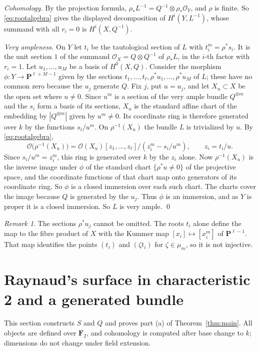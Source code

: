 \documentclass[11pt,a4paper]{article}
\theoremstyle{plain}
\theoremstyle{remark}
\newtheorem{remark}[theorem]{Remark}
\newcommand{\OO}{\mathcal O}
\newcommand{\F}{\mathbf F}
\newcommand{\PP}{\mathbf P}
\begin{document}
\emph{Cohomology.} By the projection formula, $\rho_*L^{-1}=Q^{-1}\otimes\rho_*\OO_Y$, and $\rho$ is finite. So
\eqref{eq:rootalgebra} gives the displayed decomposition of $H^i(Y,L^{-1})$, whose summand with all $r_i=0$ is
$H^i(X,Q^{-1})$.

\emph{Very ampleness.} On $Y$ let $t_i$ be the tautological section of $L$ with $t_i^m=\rho^*s_i$. It is the unit
section $1$ of the summand $\OO_X=Q\otimes Q^{-1}$ of $\rho_*L$, in the $i$-th factor with $r_i=1$. Let
$u_1,\dots,u_M$ be a basis of $H^0(X,Q)$. Consider the morphism $\phi:Y\to\PP^{\ell+M-1}$ given by the sections
$t_1,\dots,t_\ell,\rho^*u_1,\dots,\rho^*u_M$ of $L$; these have no common zero because the $u_j$ generate $Q$. Fix $j$,
put $u=u_j$, and let $X_u\subset X$ be the open set where $u\ne0$. Since $u^m$ is a section of the very ample bundle
$Q^{\otimes m}$ and the $s_i$ form a basis of its sections, $X_u$ is the standard affine chart of the embedding by
$|Q^{\otimes m}|$ given by $u^m\ne0$. Its coordinate ring is therefore generated over $k$ by the functions $s_i/u^m$. On
$\rho^{-1}(X_u)$ the bundle $L$ is trivialized by $u$. By \eqref{eq:rootalgebra},
\[
 \OO\bigl(\rho^{-1}(X_u)\bigr)=\OO(X_u)[z_1,\dots,z_\ell]/(z_i^m-s_i/u^m),\qquad z_i=t_i/u .
\]
Since $s_i/u^m=z_i^m$, this ring is generated over $k$ by the $z_i$ alone. Now $\rho^{-1}(X_u)$ is the inverse image under
$\phi$ of the standard chart $\{\rho^*u\ne0\}$ of the projective space, and the coordinate functions of that chart map
onto generators of its coordinate ring. So $\phi$ is a closed immersion over each such chart. The charts cover the image
because $Q$ is generated by the $u_j$. Thus $\phi$ is an immersion, and as $Y$ is proper it is a closed immersion. So
$L$ is very ample. \qed

\begin{remark}
The sections $\rho^*u_j$ cannot be omitted. The roots $t_i$ alone define the map to the fibre product of $X$ with the
Kummer map $[x_i]\mapsto[x_i^m]$ of $\PP^{\ell-1}$. That map identifies the points $(t_i)$ and $(\zeta t_i)$ for
$\zeta\in\mu_m$, so it is not injective.
\end{remark}

\section{Raynaud's surface in characteristic 2 and a generated bundle}

This section constructs $S$ and $Q$ and proves part (a) of Theorem~\ref{thm:main}. All objects are defined over $\F_2$,
and cohomology is computed after base change to $k$; dimensions do not change under field extension.
\end{document}
